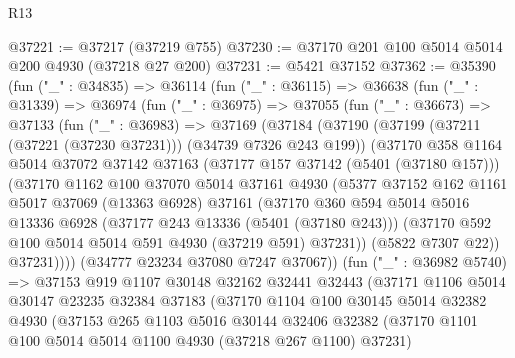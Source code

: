 \begin{lexlean}{R13}
\begin{coremodule}
@37221 := @37217 (@37219 @755)
@37230 := @37170 @201 @100 @5014 @5014 @200 @4930 (@37218 @27 @200)
@37231 := @5421 @37152
@37362 := @35390
    (fun ("_" : @34835) =>
    @36114
      (fun ("_" : @36115) =>
      @36638
        (fun ("_" : @31339) =>
        @36974
          (fun ("_" : @36975) =>
          @37055
            (fun ("_" : @36673) =>
            @37133
              (fun ("_" : @36983) =>
              @37169
                (@37184
                  (@37190
                    (@37199 (@37211 (@37221 (@37230 @37231))) (@34739 @7326 @243 @199))
                    (@37170
                      @358
                      @1164
                      @5014
                      @37072
                      @37142
                      @37163
                      (@37177 @157 @37142 (@5401 (@37180 @157)))
                      (@37170
                        @1162
                        @100
                        @37070
                        @5014
                        @37161
                        @4930
                        (@5377
                          @37152
                          @162
                          @1161
                          @5017
                          @37069
                          (@13363 @6928)
                          @37161
                          (@37170
                            @360
                            @594
                            @5014
                            @5016
                            @13336
                            @6928
                            (@37177 @243 @13336 (@5401 (@37180 @243)))
                            (@37170 @592 @100 @5014 @5014 @591 @4930 (@37219 @591) @37231))
                          (@5822 @7307 @22))
                        @37231))))
                (@34777 @23234 @37080 @7247 @37067))
              (fun ("_" : @36982 @5740) =>
              @37153
                @919
                @1107
                @30148
                @32162
                @32441
                @32443
                (@37171
                  @1106
                  @5014
                  @30147
                  @23235
                  @32384
                  @37183
                  (@37170
                    @1104
                    @100
                    @30145
                    @5014
                    @32382
                    @4930
                    (@37153
                      @265
                      @1103
                      @5016
                      @30144
                      @32406
                      @32382
                      (@37170 @1101 @100 @5014 @5014 @1100 @4930 (@37218 @267 @1100) @37231)

\end{coremodule}
\end{lexlean}
